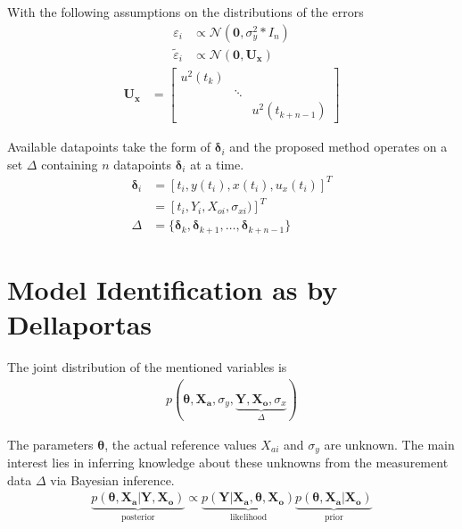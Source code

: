 \documentclass[10pt]{article}
\renewcommand{\vec}[1]{\boldsymbol{#1}}
\newcommand{\mat}[1]{\boldsymbol{#1}}
\begin{document}
With the following assumptions on the distributions of the errors
\begin{align}
    \varepsilon_i &\propto \mathcal{N}(\vec{0}, \sigma_y^2 * I_n)\\
    \tilde{\varepsilon}_i &\propto \mathcal{N}(\vec{0}, \mat{U_x}) 
\end{align}
\begin{align}
    \mat{U_x} &= \begin{bmatrix} u^2(t_k) && \\ &\ddots& \\ && u^2(t_{k+n-1}) \end{bmatrix} 
\end{align}

Available datapoints take the form of $\vec{\delta}_i$ and the proposed method operates on a set $\Delta$ containing $n$ datapoints $\vec{\delta}_i$ at a time.
\begin{align}
    \vec{\delta}_i &= [t_i, y(t_i), x(t_i), u_x(t_i)]^T \nonumber \\
                 &= [t_i, Y_i, X_{oi}, \sigma_{xi})]^T \\
    \Delta &= \{\vec{\delta}_k, \vec{\delta}_{k+1}, \dots,  \vec{\delta}_{k+n-1}\} 
\end{align}


\section{Model Identification as by Dellaportas}
The joint distribution of the mentioned variables is
\begin{align}
    p(\vec{\theta}, \vec{X_a}, \sigma_y, \underbrace{\vec{Y}, \vec{X_o}, \sigma_x}_{\Delta})
\end{align}

The parameters $\vec{\theta}$, the actual reference values $X_{ai}$ and $\sigma_{y}$ are unknown.
The main interest lies in inferring knowledge about these unknowns from the measurement data $\Delta$ via Bayesian inference.
\begin{align}
    \underbrace{p(\vec{\theta}, \vec{X_a} | \vec{Y}, \vec{X_o})}_{\text{posterior}} \propto \underbrace{p(\vec{Y} | \vec{X_a}, \vec{\theta}, \vec{X_o})}_{\text{likelihood}} \underbrace{p(\vec{\theta}, \vec{X_a} | \vec{X_o})}_{\text{prior}}
\end{align}
\end{document}
